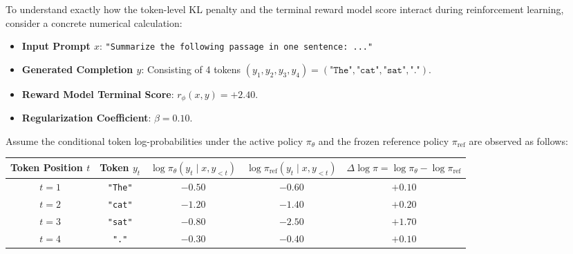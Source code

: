 \documentclass[../../../main.tex]{subfiles}
\begin{document}
\begin{tcolorbox}[colback=cardBg,colframe=cardLine,arc=2pt,boxrule=0.5pt,title=\textbf{Pedagogical Walkthrough: PPO Regularized Reward Calculation with Concrete Numbers}]
\label{box:ppo_reward_numerical_walkthrough}
To understand exactly how the token-level KL penalty and the terminal reward model score interact during reinforcement learning, consider a concrete numerical calculation:
\begin{itemize}
    \item \textbf{Input Prompt $x$}: \texttt{"Summarize the following passage in one sentence: ..."}
    \item \textbf{Generated Completion $y$}: Consisting of 4 tokens $(y_1, y_2, y_3, y_4) = (\texttt{"The"}, \texttt{"cat"}, \texttt{"sat"}, \texttt{"."})$.
    \item \textbf{Reward Model Terminal Score}: $r_\phi(x, y) = +2.40$.
    \item \textbf{Regularization Coefficient}: $\beta = 0.10$.
\end{itemize}

Assume the conditional token log-probabilities under the active policy $\pi_\theta$ and the frozen reference policy $\pi_{\text{ref}}$ are observed as follows:
\begin{center}
\small\sffamily
\begin{tabular}{ccccc}
\toprule
\textbf{Token Position $t$} & \textbf{Token $y_t$} & $\log \pi_\theta(y_t \mid x, y_{<t})$ & $\log \pi_{\text{ref}}(y_t \mid x, y_{<t})$ & $\Delta \log \pi = \log \pi_\theta - \log \pi_{\text{ref}}$ \\
\midrule
$t=1$ & \texttt{"The"} & $-0.50$ & $-0.60$ & $+0.10$ \\
$t=2$ & \texttt{"cat"} & $-1.20$ & $-1.40$ & $+0.20$ \\
$t=3$ & \texttt{"sat"} & $-0.80$ & $-2.50$ & $+1.70$ \\
$t=4$ & \texttt{"."}   & $-0.30$ & $-0.40$ & $+0.10$ \\
\bottomrule
\end{tabular}
\end{center}


\end{tcolorbox}
\end{document}
